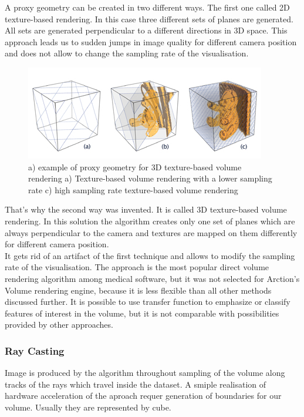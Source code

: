\documentclass[twoside, english, 11pt]{report}
\begin{document}
A proxy geometry can be created in two different ways. The first one called 2D texture-based rendering. In this case three different sets of planes are generated. All sets are generated perpendicular to a different directions in 3D space. This approach leads us to sudden jumps in image quality for different camera position and does not allow to change the sampling rate of the visualisation.\\
\begin{figure}[!h]
\centerline{
\includegraphics[scale=0.7]{img/texture-based}
}
\caption{a) example of proxy geometry for 3D texture-based volume rendering a) Texture-based volume rendering with a lower sampling rate c) high sampling rate texture-based volume rendering}
\end{figure}
That's why the second way was invented. It is called 3D texture-based volume rendering. In this solution the algorithm creates only one set of planes which are always perpendicular to the camera and textures are mapped on them differently for different camera position. \\

It gets rid of an artifact of the first technique and allows to modify the sampling rate of the visualisation. The approach is the most popular direct volume rendering algorithm among medical software, but it was not selected for Arction's Volume rendering engine, because it is less flexible than all other methods discussed further. It is possible to use transfer function to emphasize or classify features of interest in the volume, but it is not comparable with possibilities provided by other approaches.

\subsubsection{Ray Casting}

Image is produced by the algorithm throughout sampling of the volume along tracks of the rays which travel inside the dataset. A smiple realisation of hardware acceleration of the aproach requer generation of boundaries for our volume. Usually they are represented by cube. \\
\end{document}
